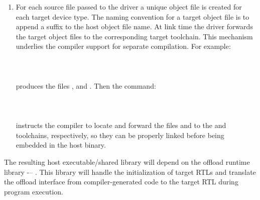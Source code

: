 \begin{enumerate}
  \item For each source file passed to the driver a unique object file is created for each target device type. The naming convention for a target object file is to append a suffix  to the host object file name. At link time the driver forwards the target object files to the corresponding target toolchain. This mechanism underlies the compiler support for separate compilation. For example:
  \\ ~ \\
  \\ ~ \\
  produces the files ,  and . Then the command:
  \\ ~ \\
  \\ ~ \\
  instructs the compiler to locate and forward the files  and to the  and  toolchains, respectively, so they can be properly linked before being embedded in the host binary.

\end{enumerate}

The resulting host executable/shared library will depend on the offload runtime library -– \libomptarget{}. This library will handle the initialization of target RTLs and translate the offload interface from compiler-generated code to the target RTL during program execution.
